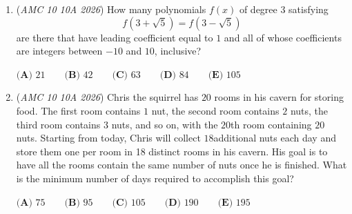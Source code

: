 \begin{enumerate}
aria-hidden="true" class="MJX-TEX"><mjx-mi class="mjx-i"><mjx-c class="mjx-c1D45E TEX-I"></mjx-c></mjx-mi></mjx-math><mjx-assistive-mml display="inline" unselectable="on"><math xmlns="http://www.w3.org/1998/Math/MathML"><mi>q</mi></math></mjx-assistive-mml></mjx-container> are between <mjx-container class="MathJax CtxtMenu\_Attached\_0" ctxtmenu\_counter="7" jax="CHTML" style="font-size: 118.4\%; position: relative;" tabindex="0"><mjx-math aria-hidden="true" class="MJX-TEX"><mjx-mn class="mjx-n"><mjx-c class="mjx-c30"></mjx-c></mjx-mn></mjx-math><mjx-assistive-mml display="inline" unselectable="on"><math xmlns="http://www.w3.org/1998/Math/MathML"><mn>0</mn></math></mjx-assistive-mml></mjx-container> and <mjx-container class="MathJax CtxtMenu\_Attached\_0" ctxtmenu\_counter="8" jax="CHTML" style="font-size: 118.4\%; position: relative;" tabindex="0"><mjx-math aria-hidden="true" class="MJX-TEX"><mjx-mn class="mjx-n"><mjx-c class="mjx-c31"></mjx-c><mjx-c class="mjx-c30"></mjx-c><mjx-c class="mjx-c30"></mjx-c></mjx-mn></mjx-math><mjx-assistive-mml display="inline" unselectable="on"><math xmlns="http://www.w3.org/1998/Math/MathML"><mn>100</mn></math></mjx-assistive-mml></mjx-container>, inclusive?


 $\textbf{(A) } 232\qquad\textbf{(B) }233\qquad\textbf{(C) }234\qquad\textbf{(D) }235\qquad\textbf{(E) }236$


	\item (\textit{AMC 10 10A 2026}) How many polynomials $f(x)$ of degree $3$ satisfying
 \[f\left( 3+\sqrt{5} \right) = f\left( 3 - \sqrt{5} \right)\]are there that have leading coefficient equal to $1$ and all of whose coefficients are integers between $-10$ and $10$, inclusive?


 $\textbf{(A) } 21 \qquad\textbf{(B) } 42 \qquad\textbf{(C) } 63 \qquad\textbf{(D) } 84 \qquad\textbf{(E) } 105$


	\item (\textit{AMC 10 10A 2026}) Chris the squirrel has $20$ rooms in his cavern for storing food. The first room contains $1$ nut,
the second room contains $2$ nuts, the third room contains $3$ nuts, and so on, with the $20$th
room containing $20$ nuts. Starting from today, Chris will collect $18$additional nuts each day
and store them one per room in 18 distinct rooms in his cavern. His goal is to have all the
rooms contain the same number of nuts once he is finished. What is the minimum number
of days required to accomplish this goal?


 $\textbf{(A) } 75\qquad\textbf{(B) }95\qquad\textbf{(C) }105\qquad\textbf{(D) }190\qquad\textbf{(E) }195$


\end{enumerate}